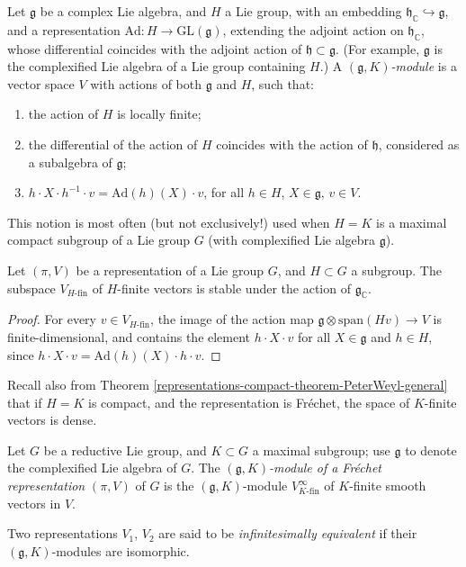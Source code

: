 \begin{definition}
 \label{definition-g-K-module}
Let $\mathfrak g$ be a complex Lie algebra, and $H$ a Lie group, with an embedding $\mathfrak h_{\mathbb C}\hookrightarrow \mathfrak g$, and a representation $\text{Ad}:H \to \text{GL}(\mathfrak g)$, extending the adjoint action on $\mathfrak h_{\mathbb C}$, whose differential coincides with the adjoint action of $\mathfrak h\subset\mathfrak g$. (For example, $\mathfrak g$ is the complexified Lie algebra of a Lie group containing $H$.) A {\it $(\mathfrak g, K)$-module} is a vector space $V$ with actions of both $\mathfrak g$ and $H$, such that:
\begin{enumerate}
 \item the action of $H$ is locally finite;
 \item the differential of the action of $H$ coincides with the action of $\mathfrak h$, considered as a subalgebra of $\mathfrak g$;
 \item $h\cdot X\cdot h^{-1}\cdot v = \text{Ad}(h)(X)\cdot v$, for all $h\in H$, $X\in \mathfrak g$, $v\in V$.
\end{enumerate}
\end{definition}

This notion is most often (but not exclusively!) used when $H=K$ is a maximal compact subgroup of a Lie group $G$ (with complexified Lie algebra $\mathfrak g$). 


\begin{lemma}
 \label{lemma-gK-of-representation}
Let $(\pi, V)$ be a representation of a Lie group $G$, and $H\subset G$ a subgroup. The subspace $V_{H\text{-fin}}$ of $H$-finite vectors is stable under the action of $\mathfrak g_{\mathbb C}$.
\end{lemma}

\begin{proof}
 For every $v\in V_{H\text{-fin}}$, the image of the action map $\mathfrak g \otimes \text{span}(Hv) \to V$ is finite-dimensional, and contains the element $h\cdot X\cdot v$ for all $X\in \mathfrak g$ and $h\in H$, since $h\cdot X\cdot v = \text{Ad}(h)(X)\cdot h\cdot v$.
\end{proof}

Recall also from Theorem \ref{representations-compact-theorem-PeterWeyl-general} that if $H=K$ is compact, and the representation is Fr\'echet, the space of $K$-finite vectors is dense.

\begin{definition}
 \label{definition-gK-of-representation}
Let $G$ be a reductive Lie group, and $K\subset G$ a maximal subgroup; use $\mathfrak g$ to denote the complexified Lie algebra of $G$. The {\it $(\mathfrak g, K)$-module of a Fr\'echet representation} $(\pi, V)$ of $G$ is the  $(\mathfrak g, K)$-module $V^\infty_{K\text{-fin}}$ of $K$-finite smooth vectors in $V$. 

Two representations $V_1$, $V_2$ are said to be {\it infinitesimally equivalent} if their $(\mathfrak g, K)$-modules are isomorphic.
\end{definition}


